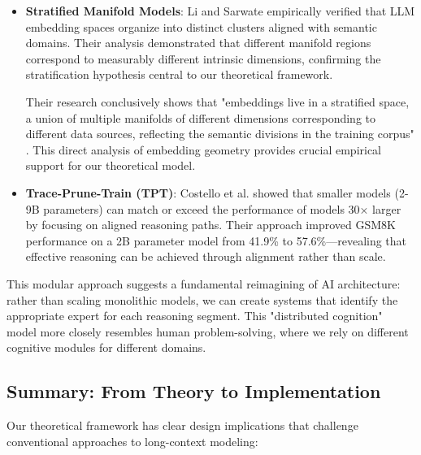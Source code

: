 \documentclass{article}
\begin{document}
\begin{itemize}
\item \textbf{Stratified Manifold Models}: Li and Sarwate \citep{li2025unraveling} empirically verified that LLM embedding spaces organize into distinct clusters aligned with semantic domains. Their analysis demonstrated that different manifold regions correspond to measurably different intrinsic dimensions, confirming the stratification hypothesis central to our theoretical framework.

  Their research conclusively shows that "embeddings live in a stratified space, a union of multiple manifolds of different dimensions corresponding to different data sources, reflecting the semantic divisions in the training corpus" \citep{li2025unraveling}. This direct analysis of embedding geometry provides crucial empirical support for our theoretical model.

\item \textbf{Trace-Prune-Train (TPT)}: Costello et al. \citep{costello2025think} showed that smaller models (2-9B parameters) can match or exceed the performance of models 30× larger by focusing on aligned reasoning paths. Their approach improved GSM8K performance on a 2B parameter model from 41.9\% to 57.6\%—revealing that effective reasoning can be achieved through alignment rather than scale.
\end{itemize}

This modular approach suggests a fundamental reimagining of AI architecture: rather than scaling monolithic models, we can create systems that identify the appropriate expert for each reasoning segment. This "distributed cognition" model more closely resembles human problem-solving, where we rely on different cognitive modules for different domains.

\subsection{Summary: From Theory to Implementation}

Our theoretical framework has clear design implications that challenge conventional approaches to long-context modeling:
\end{document}
